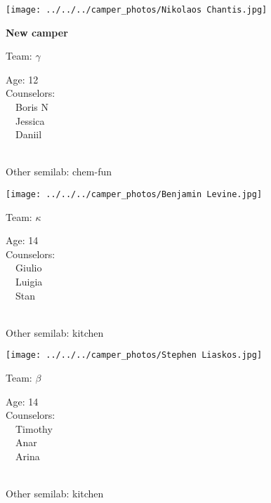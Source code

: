 \documentclass[10pt,letterpaper, landscape]{article}
\begin{document}
\horizontalshiftfornextsticker
\renewcommand{\baselinestretch}{1} \begin{sticker}
\noindent\begin{minipage}{0.5\textwidth}\texttt{[image: ../../../camper\_photos/Nikolaos Chantis.jpg]}\end{minipage}\begin{minipage}{0.45\textwidth}
\textbf{New camper} 

Team: {\Large $\gamma$}

Age:        12\\
Counselors: \\\ \ Boris N\\\ \ Jessica\\\ \ Daniil\\
\end{minipage} \\ \vspace{0.07in}
Other semilab: chem-fun
\end{sticker}
\horizontalshiftfornextsticker
\renewcommand{\baselinestretch}{1} \begin{sticker}
\noindent\begin{minipage}{0.5\textwidth}\texttt{[image: ../../../camper\_photos/Benjamin Levine.jpg]}\end{minipage}\begin{minipage}{0.45\textwidth}
Team: {\Large $\kappa$}

Age:        14\\
Counselors: \\\ \ Giulio\\\ \ Luigia\\\ \ Stan\\
\end{minipage} \\ \vspace{0.07in}
Other semilab: kitchen
\end{sticker}
\verticalshiftfornextsticker
\renewcommand{\baselinestretch}{1} \begin{sticker}
\noindent\begin{minipage}{0.5\textwidth}\texttt{[image: ../../../camper\_photos/Stephen Liaskos.jpg]}\end{minipage}\begin{minipage}{0.45\textwidth}
Team: {\Large $\beta$}

Age:        14\\
Counselors: \\\ \ Timothy\\\ \ Anar\\\ \ Arina\\
\end{minipage} \\ \vspace{0.07in}
Other semilab: kitchen
\end{sticker}
\end{document}
